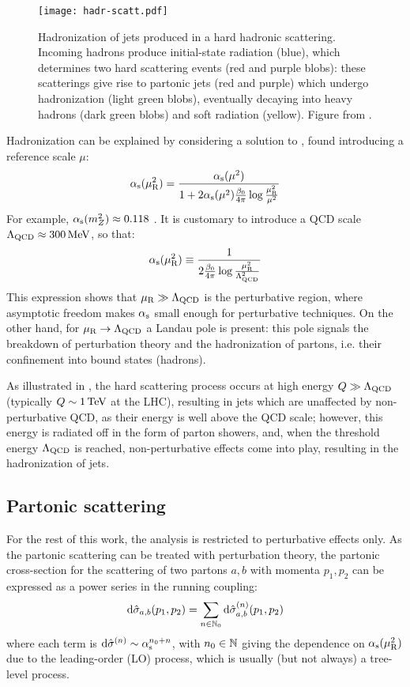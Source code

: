 \begin{figure}
  \centering
  \texttt{[image: hadr-scatt.pdf]}
  \caption{Hadronization of jets produced in a hard hadronic scattering. Incoming hadrons produce initial-state radiation (blue), which determines two hard scattering events (red and purple blobs): these scatterings give rise to partonic jets (red and purple) which undergo hadronization (light green blobs), eventually decaying into heavy hadrons (dark green blobs) and soft radiation (yellow). Figure from \cite{Hoche-2014}.}
  \label{fig:hadr-scatt}
\end{figure}

Hadronization can be explained by considering a solution to , found introducing a reference scale $ \mu $:
\begin{equation}
  \alpha_\text{s}(\mu_\text{R}^2) = \frac{\alpha_\text{s}(\mu^2)}{1 + 2 \alpha_\text{s}(\mu^2) \frac{\beta_0}{4\pi} \log \frac{\mu_\text{R}^2}{\mu^2}}
\end{equation}
For example, $ \alpha_\text{s}(m_Z^2) \approx 0.118 $ \cite{PDG-2024}. It is customary to introduce a QCD scale $ \Lambda_\text{QCD} \approx 300 \,\mathrm{MeV} $, so that:
\begin{equation}
  \alpha_\text{s}(\mu_\text{R}^2) \equiv \frac{1}{2\frac{\beta_0}{4\pi} \log \frac{\mu_\text{R}^2}{\Lambda_\text{QCD}^2}}
\end{equation}
This expression shows that $ \mu_\text{R} \gg \Lambda_\text{QCD} $ is the perturbative region, where asymptotic freedom makes $ \alpha_\text{s} $ small enough for perturbative techniques. On the other hand, for $ \mu_\text{R} \rightarrow \Lambda_\text{QCD} $ a Landau pole is present: this pole signals the breakdown of perturbation theory and the hadronization of partons, i.e. their confinement into bound states (hadrons).

As illustrated in , the hard scattering process occurs at high energy $ Q \gg \Lambda_\text{QCD} $ (typically $ Q \sim 1\,\mathrm{TeV} $ at the LHC), resulting in jets which are unaffected by non-perturbative QCD, as their energy is well above the QCD scale; however, this energy is radiated off in the form of parton showers, and, when the threshold energy $ \Lambda_\text{QCD} $ is reached, non-perturbative effects come into play, resulting in the hadronization of jets.

\subsection{Partonic scattering}

For the rest of this work, the analysis is restricted to perturbative effects only. As the partonic scattering can be treated with perturbation theory, the partonic cross-section for the scattering of two partons $ a , b $ with momenta $ p_1 , p_2 $ can be expressed as a power series in the running coupling:
\begin{equation}
  \mathrm{d}\hat{\sigma}_{a,b}(p_1 , p_2) = \sum_{n \in \mathbb{N}_0} \mathrm{d}\hat{\sigma}_{a,b}^{(n)}(p_1 , p_2)
  \label{eq:part-ser-exp}
\end{equation}
where each term is $ \mathrm{d}\hat{\sigma}^{(n)} \sim \alpha_\text{s}^{n_0 + n} $, with $ n_0 \in \mathbb{N} $ giving the dependence on $ \alpha_\text{s}(\mu_\text{R}^2) $ due to the leading-order (LO) process, which is usually (but not always) a tree-level process.

